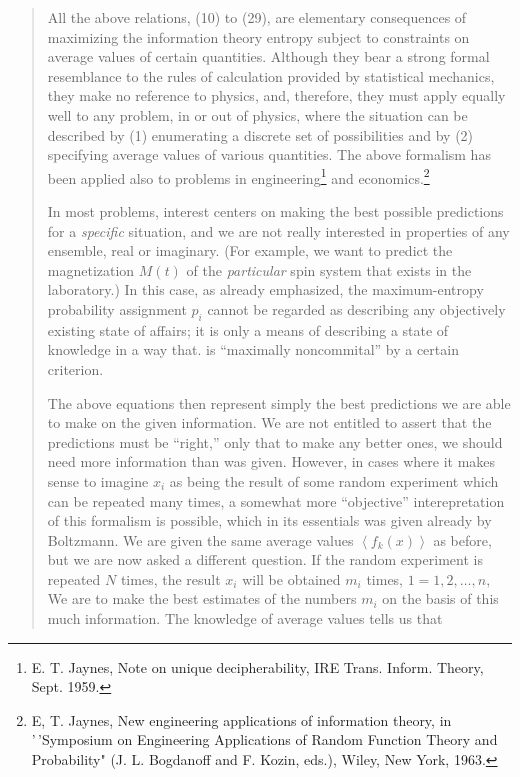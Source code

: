 \documentclass[]{article}
\begin{document}
\begin{quote}
All the above relations, (10) to (29), are elementary consequences of
maximizing the information theory entropy subject to constraints on
average values of certain quantities. Although they bear a strong formal
resemblance to the rules of calculation provided by statistical
mechanics, they make no reference to physics, and, therefore, they must
apply equally well to any problem, in or out of physics, where the
situation can be described by (1) enumerating a discrete set of
possibilities and by (2) specifying average values of various
quantities. The above formalism has been applied also to problems in
engineering\footnote{E. T. Jaynes, Note on unique decipherability, IRE
  Trans. Inform. Theory, Sept. 1959.} and economics.\footnote{E, T.
  Jaynes, New engineering applications of information theory, in
  '\,'Symposium on Engineering Applications of Random Function Theory
  and Probability" (J. L. Bogdanoff and F. Kozin, eds.), Wiley, New
  York, 1963.}

In most problems, interest centers on making the best possible
predictions for a \emph{specific} situation, and we are not really
interested in properties of any ensemble, real or imaginary. (For
example, we want to predict the magnetization \(M(t)\) of the
\emph{particular} spin system that exists in the laboratory.) In this
case, as already emphasized, the maximum-entropy probability assignment
\(p_{i}\) cannot be regarded as describing any objectively existing
state of affairs; it is only a means of describing a state of knowledge
in a way that. is ``maximally noncommital'' by a certain criterion.

The above equations then represent simply the best predictions we are
able to make on the given information. We are not entitled to assert
that the predictions must be ``right,'' only that to make any better
ones, we should need more information than was given. However, in cases
where it makes sense to imagine \(x_{i}\) as being the result of some
random experiment which can be repeated many times, a somewhat more
``objective'' interepretation of this formalism is possible, which in
its essentials was given already by Boltzmann. We are given the same
average values \(\left\langle f_{k}(x) \right\rangle\) as before, but we
are now asked a different question. If the random experiment is repeated
\(N\) times, the result \(x_{i}\) will be obtained \(m_{i}\) times,
\(1 = 1,2,\ldots,n,\) We are to make the best estimates of the numbers
\(m_{i}\) on the basis of this much information. The knowledge of
average values tells us that


\end{quote}
\end{document}

